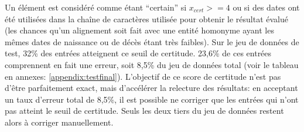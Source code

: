 Un élément est considéré comme étant \enquote{certain} si \(x_{cert} >= 4\) ou si des dates ont été utilisées dans la chaîne de caractères utilisée pour obtenir le résultat évalué (les chances qu'un alignement soit fait avec une entité homonyme ayant les mêmes dates de naissance ou de décès étant très faibles). Sur le jeu de données de test, 32\% des entrées atteignent ce seuil de certitude. 23,6\% de ces entrées comprennent en fait une erreur, soit 8,5\% du jeu de données total (voir le tableau en annexes: \ref{appendix:testfinal}). L'objectif de ce score de certitude n'est pas d'être parfaitement exact, mais d'accélérer la relecture des résultats: en acceptant un taux d'erreur total de 8,5\%, il est possible ne corriger que les entrées qui n'ont pas atteint le seuil de certitude. Seuls les deux tiers du jeu de données restent alors à corriger manuellement.

